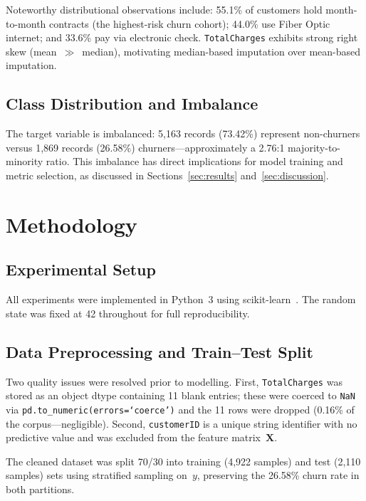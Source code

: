 \documentclass{llncs}
\begin{document}
Noteworthy distributional observations include: 55.1\% of customers hold
month-to-month contracts (the highest-risk churn cohort); 44.0\% use
Fiber Optic internet; and 33.6\% pay via electronic check.
\texttt{TotalCharges} exhibits strong right skew (mean~$\gg$~median),
motivating median-based imputation over mean-based imputation.

\subsection{Class Distribution and Imbalance}

The target variable is imbalanced: 5{,}163 records (73.42\%) represent
non-churners versus 1{,}869 records (26.58\%) churners---approximately a
2.76:1 majority-to-minority ratio. This imbalance has direct implications
for model training and metric selection, as discussed in
Sections~\ref{sec:results} and~\ref{sec:discussion}.

\section{Methodology}
\label{sec:method}

\subsection{Experimental Setup}

All experiments were implemented in Python~3 using
scikit-learn~\cite{pedregosa2011scikit}. The random state was fixed at 42
throughout for full reproducibility.

\subsection{Data Preprocessing and Train--Test Split}

Two quality issues were resolved prior to modelling.
First, \texttt{TotalCharges} was stored as an object dtype containing
11 blank entries; these were coerced to \texttt{NaN} via
\texttt{pd.to\_numeric(errors=`coerce')} and the 11 rows were dropped
(0.16\% of the corpus---negligible).
Second, \texttt{customerID} is a unique string identifier with no
predictive value and was excluded from the feature matrix~$\mathbf{X}$.

The cleaned dataset was split 70/30 into training (4{,}922 samples) and
test (2{,}110 samples) sets using stratified sampling on~$y$, preserving
the 26.58\% churn rate in both partitions.
\end{document}
